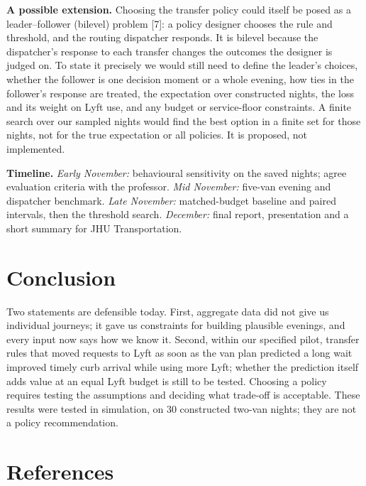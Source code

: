 \documentclass{article}
\begin{document}
\begin{enumerate}
\end{enumerate}

\textbf{A possible extension.} Choosing the transfer policy could itself be posed as a leader--follower (bilevel) problem [7]: a policy designer chooses the rule and threshold, and the routing dispatcher responds. It is bilevel because the dispatcher's response to each transfer changes the outcomes the designer is judged on. To state it precisely we would still need to define the leader's choices, whether the follower is one decision moment or a whole evening, how ties in the follower's response are treated, the expectation over constructed nights, the loss and its weight on Lyft use, and any budget or service-floor constraints. A finite search over our sampled nights would find the best option in a finite set for those nights, not for the true expectation or all policies. It is proposed, not implemented.

\textbf{Timeline.} \emph{Early November:} behavioural sensitivity on the saved nights; agree evaluation criteria with the professor. \emph{Mid November:} five-van evening and dispatcher benchmark. \emph{Late November:} matched-budget baseline and paired intervals, then the threshold search. \emph{December:} final report, presentation and a short summary for JHU Transportation.

\section{Conclusion}\label{sec:conclusion}

Two statements are defensible today. First, aggregate data did not give us individual journeys; it gave us constraints for building plausible evenings, and every input now says how we know it. Second, within our specified pilot, transfer rules that moved requests to Lyft as soon as the van plan predicted a long wait improved timely curb arrival while using more Lyft; whether the prediction itself adds value at an equal Lyft budget is still to be tested. Choosing a policy requires testing the assumptions and deciding what trade-off is acceptable. These results were tested in simulation, on 30 constructed two-van nights; they are not a policy recommendation.

\section*{References}
\end{document}
